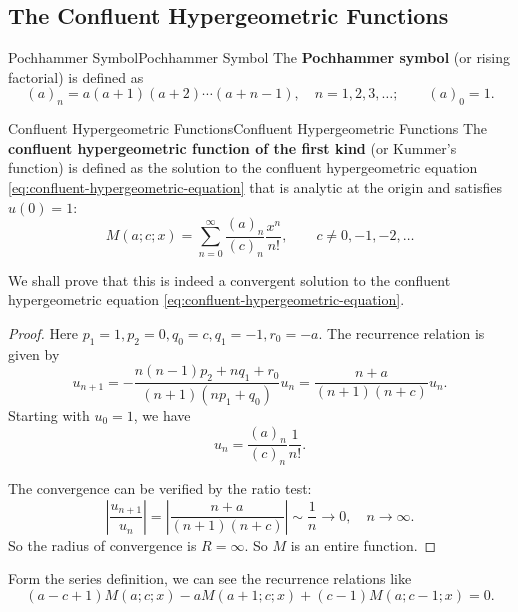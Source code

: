 \documentclass[../main.tex]{subfiles}
\begin{document}
\subsection{The Confluent Hypergeometric Functions}

\begin{definition}{Pochhammer Symbol}{Pochhammer Symbol}
	The \textbf{Pochhammer symbol} (or rising factorial) is defined as
	\begin{equation}
		(a)_n = a(a+1)(a+2)\cdots(a+n-1), \quad n=1,2,3,\ldots; \qquad (a)_0 = 1.
	\end{equation}
\end{definition}
\begin{definition}{Confluent Hypergeometric Functions}{Confluent Hypergeometric Functions}
	The \textbf{confluent hypergeometric function of the first kind} (or Kummer's function) is defined as the solution to the confluent hypergeometric equation \eqref{eq:confluent-hypergeometric-equation} that is analytic at the origin and satisfies $u(0)=1$:
	\begin{equation}
		M(a; c; x) = \sum_{n=0}^{\infty} \frac{(a)_n}{(c)_n} \frac{x^n}{n!}, \qquad c \neq 0, -1, -2, \ldots
	\end{equation}
\end{definition}
We shall prove that this is indeed a convergent solution to the confluent hypergeometric equation \eqref{eq:confluent-hypergeometric-equation}.
\begin{proof}
	Here $p_1=1, p_2=0, q_0=c, q_1=-1, r_0=-a$. The recurrence relation is given by
	\begin{equation*}
		u_{n+1} = -\frac{n(n-1) p_2 + n q_1 + r_0}{(n+1)(n p_1 + q_0)} u_n = \frac{n + a}{(n+1)(n + c)} u_n.
	\end{equation*}
	Starting with $u_0=1$, we have
	\begin{equation*}
		u_n = \frac{(a)_n}{(c)_n} \frac{1}{n!}.
	\end{equation*}

	The convergence can be verified by the ratio test:
	\begin{equation*}
		\left|\frac{u_{n+1}}{u_n}\right| = \left|\frac{n + a}{(n+1)(n + c)}\right| \sim \frac{1}{n} \rightarrow 0, \quad n \to \infty.
	\end{equation*}
	So the radius of convergence is $R=\infty$. So $M$ is an entire function.
\end{proof}

Form the series definition, we can see the recurrence relations like
\begin{equation}
	(a-c+1)M(a; c; x) - a M(a+1; c; x) + (c-1) M(a; c-1; x) = 0.
\end{equation}
\end{document}
